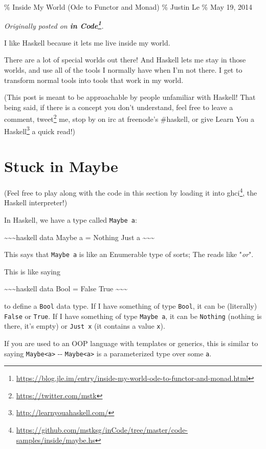\documentclass[]{article}
\renewcommand{\href}[2]{#2\footnote{\url{#1}}}
\begin{document}
\% Inside My World (Ode to Functor and Monad) \% Justin Le \% May 19, 2014

\emph{Originally posted on
\textbf{\href{https://blog.jle.im/entry/inside-my-world-ode-to-functor-and-monad.html}{in
Code}}.}

I like Haskell because it lets me live inside my world.

There are a lot of special worlds out there! And Haskell lets me stay in those
worlds, and use all of the tools I normally have when I'm not there. I get to
transform normal tools into tools that work in my world.

(This post is meant to be approachable by people unfamiliar with Haskell! That
being said, if there is a concept you don't understand, feel free to leave a
comment, \href{https://twitter.com/mstk}{tweet} me, stop by on irc at freenode's
\#haskell, or give \href{http://learnyouahaskell.com/}{Learn You a Haskell} a
quick read!)

\section{Stuck in Maybe}

(Feel free to play along with the code in this section by
\href{https://github.com/mstksg/inCode/tree/master/code-samples/inside/maybe.hs}{loading
it into ghci}, the Haskell interpreter!)

In Haskell, we have a type called \texttt{Maybe\ a}:

\textasciitilde{}\textasciitilde{}\textasciitilde{}haskell data Maybe a =
Nothing \textbar{} Just a \textasciitilde{}\textasciitilde{}\textasciitilde{}

This says that \texttt{Maybe\ a} is like an Enumerable type of sorts; The
\texttt{\textbar{}} reads like "\emph{or}".

This is like saying

\textasciitilde{}\textasciitilde{}\textasciitilde{}haskell data Bool = False
\textbar{} True \textasciitilde{}\textasciitilde{}\textasciitilde{}

to define a \texttt{Bool} data type. If I have something of type \texttt{Bool},
it can be (literally) \texttt{False} or \texttt{True}. If I have something of
type \texttt{Maybe\ a}, it can be \texttt{Nothing} (nothing is there, it's
empty) or \texttt{Just\ x} (it contains a value \texttt{x}).

If you are used to an OOP language with templates or generics, this is similar
to saying \texttt{Maybe\textless{}a\textgreater{}} -\/-
\texttt{Maybe\textless{}a\textgreater{}} is a parameterized type over some
\texttt{a}.
\end{document}
